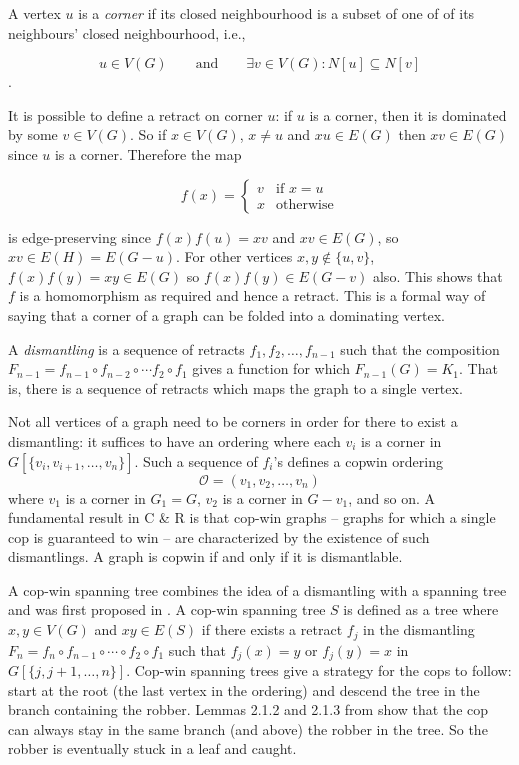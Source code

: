 A vertex $u$ is a \textit{corner} if its closed neighbourhood
is a subset of one of of its neighbours' closed neighbourhood, i.e.,

\[u \in V(G) \qquad \text{and} \qquad \exists v\in V(G) : N[u] \subseteq N[v] \].

It is possible to define a retract on corner $u$: if $u$ is a corner, then it is
dominated by some $v \in V(G)$. So if $x \in V(G)$, $x \neq u$ and
$xu \in E(G)$ then $xv \in E(G)$ since $u$ is a corner. Therefore the map

\[ f(x) = \begin{cases}
v & \text{if } x = u \\
x & \text{otherwise}
\end{cases} \]

is edge-preserving since $f(x)f(u) = xv$ and $xv \in E(G)$, so $xv \in E(H) = E(G - u)$.
For other vertices $x,y \not\in \{u,v\}$, $f(x)f(y) = xy \in E(G)$ so $f(x)f(y) \in E(G- v)$ also.
This shows that $f$ is a homomorphism as required and hence a retract.
This is a formal way of saying that a corner of a graph can be folded into a
dominating vertex.

A \textit{dismantling} is a sequence of retracts $f_1, f_2, \dots, f_{n-1}$ such that the
composition $F_{n-1} = f_{n-1} \circ f_{n-2} \circ \cdots f_2 \circ f_1$ gives a
function for which $F_{n-1} (G) = K_1$. That is, there is a sequence of retracts
which maps the graph to a single vertex.

Not all vertices of a graph need to be corners in order for there
to exist a dismantling: it suffices to have an ordering where each $v_i$ is a corner in
$G[\{v_i, v_{i+1}, \dots, v_n\}]$.
Such a sequence of $f_i$'s defines a copwin ordering
\[ \mathcal{O} = ( v_1, v_2, \dots, v_n ) \]
 where $v_1$ is a corner in $G_1 = G$, $v_2$ is a corner in $G - v_1$, and so on.
A fundamental result in C \& R is that cop-win graphs -- graphs for which a single
cop is guaranteed to win --  are characterized by the existence of such dismantlings.
A graph is copwin if and only if it is dismantlable.

A cop-win spanning tree combines the idea of a dismantling with a spanning tree
and was first proposed in \cite{clarke2002constrained}. A cop-win spanning tree $S$ is defined as a tree where $x,y\in V(G)$ and $xy \in E(S)$ if there exists a retract $f_j$ in the dismantling
$F_n = f_{n} \circ f_{n-1} \circ \cdots \circ f_{2} \circ f_1$
such that $f_j (x) = y$ or $f_j (y) = x$ in $G[\{j, j+1, \dots, n \}]$.
Cop-win spanning trees give a strategy for the cops to follow: start at the root
(the last vertex in the ordering) and descend the tree in the branch containing the robber.
Lemmas 2.1.2 and 2.1.3 from \cite{clarke2002constrained} show that the cop
can always stay in the same branch (and above) the robber in the tree. So the
robber is eventually stuck in a leaf and caught.
